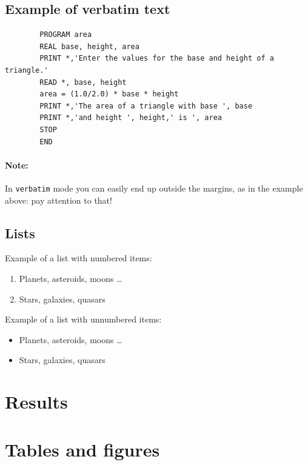 \documentclass[a4paper,10pt]{article}
\begin{document}
\subsection{Example of verbatim text}

\begin{verbatim}
        PROGRAM area
        REAL base, height, area
        PRINT *,'Enter the values for the base and height of a triangle.'
        READ *, base, height
        area = (1.0/2.0) * base * height
        PRINT *,'The area of a triangle with base ', base
        PRINT *,'and height ', height,' is ', area
        STOP
        END
\end{verbatim}

\paragraph{Note:}
In \texttt{verbatim} mode you can easily end up outside the
margins, as in the example above: pay attention to that!

\subsection{Lists}
Example of a list with numbered items:

   \begin{enumerate}
      \item  Planets, asteroids, moons \ldots
      \item  Stars, galaxies, quasars
  \end{enumerate}

Example of a list with unnumbered items:

   \begin{itemize}
      \item  Planets, asteroids, moons \ldots
      \item  Stars, galaxies, quasars
          
   \end{itemize}

\section{Results}

\newpage
\section{Tables and figures}
\end{document}
